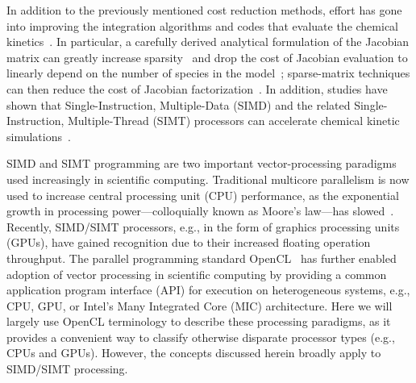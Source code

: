 \documentclass[12pt,number,sort&compress,preprint]{elsarticle}
\begin{document}
In addition to the previously mentioned cost reduction methods, effort has gone into improving the integration algorithms and codes that evaluate the chemical kinetics~\cite{Gou:2010,SCHWER2002270,Niemeyer:2016aa,GAO2015287}.
In particular, a carefully derived analytical formulation of the Jacobian matrix can greatly increase sparsity~\cite{SCHWER2002270} and drop the cost of Jacobian evaluation to linearly depend on the number of species in the model~\cite{LU2009192}; sparse-matrix techniques can then reduce the cost of Jacobian factorization~\cite{superlu99}.
In addition, studies have shown that Single-Instruction, Multiple-Data (SIMD) and the related Single-Instruction, Multiple-Thread (SIMT) processors can accelerate chemical kinetic simulations~\cite{Shi:2012aa,Niemeyer:2014aa,Sewerin20151375,Niemeyer:2016aa,CurtisGPU:2017,stone2018}.

SIMD and SIMT programming are two important vector-processing paradigms used increasingly in scientific computing.
Traditional multicore parallelism is now used to increase central processing unit (CPU) performance, as the exponential growth in processing power---colloquially known as Moore's law---has slowed~\cite{khan2018science}.
Recently, SIMD\slash SIMT processors, e.g., in the form of graphics processing units (GPUs), have gained recognition due to their increased floating operation throughput.
The parallel programming standard OpenCL~\cite{stone2010opencl} has further enabled adoption of vector processing in scientific computing by providing a common application program interface (API) for execution on heterogeneous systems, e.g., CPU, GPU, or Intel's Many Integrated Core (MIC) architecture.
Here we will largely use OpenCL terminology to describe these processing paradigms, as it provides a convenient way to classify otherwise disparate processor types (e.g., CPUs and GPUs).
However, the concepts discussed herein broadly apply to SIMD\slash SIMT processing.
\end{document}
